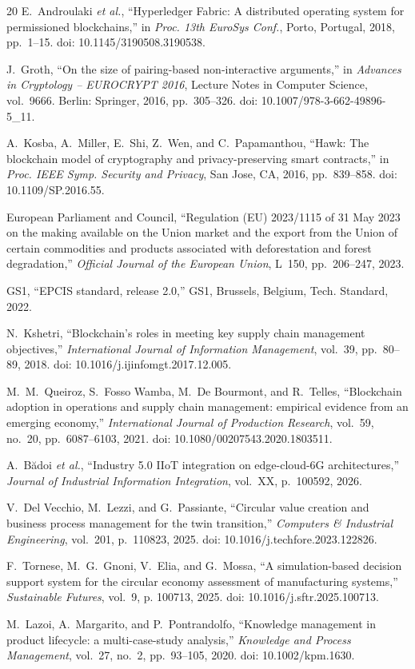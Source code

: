 \documentclass[journal]{IEEEtran}
\begin{document}
\begin{thebibliography}{20}
E.~Androulaki \emph{et al.}, ``Hyperledger Fabric: A distributed operating system for permissioned blockchains,'' in \emph{Proc. 13th EuroSys Conf.}, Porto, Portugal, 2018, pp.~1--15. doi: 10.1145/3190508.3190538.

J.~Groth, ``On the size of pairing-based non-interactive arguments,'' in \emph{Advances in Cryptology -- EUROCRYPT 2016}, Lecture Notes in Computer Science, vol.~9666. Berlin: Springer, 2016, pp.~305--326. doi: 10.1007/978-3-662-49896-5\_11.

A.~Kosba, A.~Miller, E.~Shi, Z.~Wen, and C.~Papamanthou, ``Hawk: The blockchain model of cryptography and privacy-preserving smart contracts,'' in \emph{Proc. IEEE Symp. Security and Privacy}, San Jose, CA, 2016, pp.~839--858. doi: 10.1109/SP.2016.55.

European Parliament and Council, ``Regulation (EU) 2023/1115 of 31 May 2023 on the making available on the Union market and the export from the Union of certain commodities and products associated with deforestation and forest degradation,'' \emph{Official Journal of the European Union}, L~150, pp.~206--247, 2023.

GS1, ``EPCIS standard, release 2.0,'' GS1, Brussels, Belgium, Tech. Standard, 2022.

N.~Kshetri, ``Blockchain's roles in meeting key supply chain management objectives,'' \emph{International Journal of Information Management}, vol.~39, pp.~80--89, 2018. doi: 10.1016/j.ijinfomgt.2017.12.005.

M.~M.~Queiroz, S.~Fosso Wamba, M.~De Bourmont, and R.~Telles, ``Blockchain adoption in operations and supply chain management: empirical evidence from an emerging economy,'' \emph{International Journal of Production Research}, vol.~59, no.~20, pp.~6087--6103, 2021. doi: 10.1080/00207543.2020.1803511.

A.~B\u{a}doi \emph{et al.}, ``Industry 5.0 IIoT integration on edge-cloud-6G architectures,'' \emph{Journal of Industrial Information Integration}, vol.~XX, p.~100592, 2026.

V.~Del Vecchio, M.~Lezzi, and G.~Passiante, ``Circular value creation and business process management for the twin transition,'' \emph{Computers \& Industrial Engineering}, vol.~201, p.~110823, 2025. doi: 10.1016/j.techfore.2023.122826.

F.~Tornese, M.~G.~Gnoni, V.~Elia, and G.~Mossa, ``A simulation-based decision support system for the circular economy assessment of manufacturing systems,'' \emph{Sustainable Futures}, vol.~9, p. 100713, 2025. doi: 10.1016/j.sftr.2025.100713.

M.~Lazoi, A.~Margarito, and P.~Pontrandolfo, ``Knowledge management in product lifecycle: a multi-case-study analysis,'' \emph{Knowledge and Process Management}, vol.~27, no.~2, pp.~93--105, 2020. doi: 10.1002/kpm.1630.

\end{thebibliography}
\end{document}
